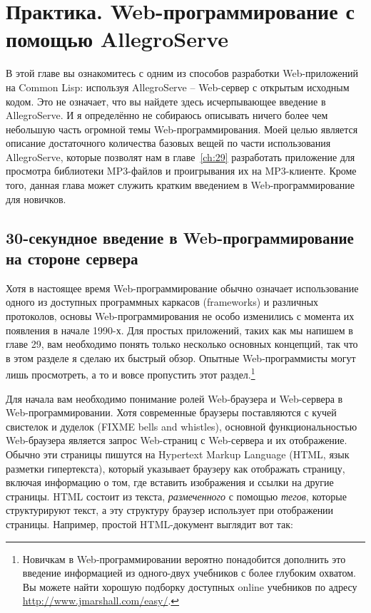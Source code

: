 \chapter{Практика. Web-программирование с помощью AllegroServe}
\label{ch:26}

В этой главе вы ознакомитесь с одним из способов разработки Web-приложений на Common Lisp:
используя AllegroServe -- Web-сервер с открытым исходным кодом. Это не означает, что вы
найдете здесь исчерпывающее введение в AllegroServe. И я определённо не собираюсь
описывать ничего более чем небольшую часть огромной темы Web-программирования. Моей целью
является описание достаточного количества базовых вещей по части использования
AllegroServe, которые позволят нам в главе~\ref{ch:29} разработать приложение для
просмотра библиотеки MP3-файлов и проигрывания их на MP3-клиенте. Кроме того, данная глава
может служить кратким введением в Web-программирование для новичков.

\section{30-секундное введение в Web-программирование на стороне сервера}

Хотя в настоящее время Web-программирование обычно означает использование одного из
доступных программных каркасов (frameworks) и различных протоколов, основы
Web-программирования не особо изменились с момента их появления в начале 1990-х. Для
простых приложений, таких как мы напишем в главе 29, вам необходимо понять только
несколько основных концепций, так что в этом разделе я сделаю их быстрый обзор. Опытные
Web-программисты могут лишь просмотреть, а то и вовсе пропустить этот
раздел.\footnote{Новичкам в Web-программировании вероятно понадобится дополнить это
  введение информацией из одного-двух учебников с более глубоким охватом. Вы можете найти
  хорошую подборку доступных online учебников по адресу
  \url{http://www.jmarshall.com/easy/}.}

Для начала вам необходимо понимание ролей Web-браузера и Web-сервера в
Web-программировании. Хотя современные браузеры поставляются с кучей свистелок и дуделок
(FIXME bells and whistles), основной функциональностью Web-браузера является запрос
Web-страниц с Web-сервера и их отображение. Обычно эти страницы пишутся на Hypertext
Markup Language (HTML, язык разметки гипертекста), который указывает браузеру как
отображать страницу, включая информацию о том, где вставить изображения и ссылки на другие
страницы. HTML состоит из текста, \textit{размеченного} с помощью \textit{тегов}, которые
структурируют текст, а эту структуру браузер использует при отображении
страницы. Например, простой HTML-документ выглядит вот так:

